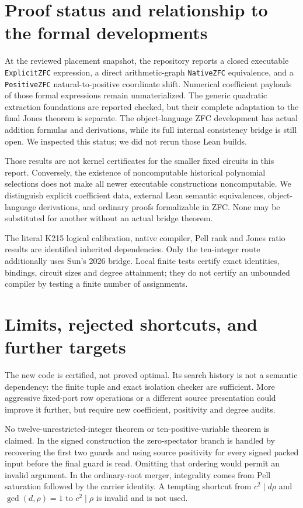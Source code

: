 \documentclass[11pt]{article}
\begin{document}
\section{Proof status and relationship to the formal developments}
At the reviewed placement snapshot, the repository reports a closed
executable \texttt{ExplicitZFC} expression, a direct arithmetic-graph
\texttt{NativeZFC} equivalence, and a \texttt{PositiveZFC} natural-to-positive
coordinate shift. Numerical coefficient payloads of those formal expressions
remain unmaterialized. The generic quadratic extraction foundations are
reported checked, but their complete adaptation to the final Jones theorem
is separate. The object-language ZFC development has actual addition
formulas and derivations, while its full internal consistency bridge is
still open. We inspected this status; we did not rerun those Lean builds.

Those results are not kernel certificates for the smaller fixed circuits
in this report. Conversely, the existence of noncomputable historical
polynomial selections does not make all newer executable constructions
noncomputable. We distinguish explicit coefficient data, external Lean
semantic equivalences, object-language derivations, and ordinary proofs
formalizable in ZFC. None may be substituted for another without an actual
bridge theorem.

The literal K215 logical calibration, native compiler, Pell rank and Jones
ratio results are identified inherited dependencies. Only the ten-integer
route additionally uses Sun's 2026 bridge. Local finite tests certify exact
identities, bindings, circuit sizes and degree attainment; they do not
certify an unbounded compiler by testing a finite number of assignments.



\section{Limits, rejected shortcuts, and further targets}
The new code is certified, not proved optimal. Its search history is not a
semantic dependency: the finite tuple and exact isolation checker are
sufficient. More aggressive fixed-port row operations or a different
source presentation could improve it further, but require new coefficient,
positivity and degree audits.

No twelve-unrestricted-integer theorem or ten-positive-variable theorem is
claimed. In the signed construction the zero-spectator branch is handled
by recovering the first two guards and using source positivity for every
signed packed input before the final guard is read. Omitting that ordering
would permit an invalid argument. In the ordinary-root merger, integrality
comes from Pell saturation followed by the carrier identity. A tempting
shortcut from $c^2\mid d\rho$ and $\gcd(d,\rho)=1$ to $c^2\mid\rho$ is
invalid and is not used.
\end{document}
